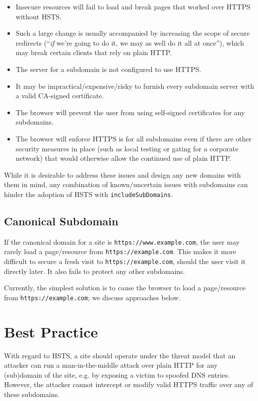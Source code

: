 \documentclass[conference]{./IEEEtran}
\newcommand{\site}[1]{\texttt{#1}}
\newcommand{\code}[1]{\texttt{#1}}
\newcommand{\iSD}{{\code{includeSubDomains}}}
\newcommand{\genericsite}{example.com}
\newcommand{\s}{{\site{https://\genericsite}}}
\newcommand{\sw}{{\site{https://www.\genericsite}}}
\theoremstyle{plain}
\begin{document}
\begin{itemize}
\item Insecure resources will fail to load and break pages that worked over HTTPS without HSTS.
\item Such a large change is usually accompanied by increasing the scope of secure redirects (``\emph{if} we're going to do it, we may as well do it all at once''), which may break certain clients that rely on plain HTTP.\item The server for a subdomain is not configured to use HTTPS.
\item It may be impractical/expensive/risky to furnish every subdomain server with a valid CA-signed certificate.
\item The browser will prevent the user from using self-signed certificates for any subdomains.
\item The browser will enforce HTTPS is for all subdomains even if there are other security measures in place (such as local testing or gating for a corporate network) that would otherwise allow the continued use of plain HTTP.
\end{itemize}

While it is desirable to address these issues and design any new domains with them in mind, any combination of known/uncertain issues with subdomains can hinder the adoption of HSTS with \iSD.

\subsection{Canonical Subdomain}

If the canonical domain for a site is \sw, the user may rarely load a page/resource from \s. This makes it more difficult to secure a fresh visit to \s, should the user visit it directly later. It also fails to protect any other subdomains.

Currently, the simplest solution is to cause the browser to load a page/resource from \s; we discuss approaches below. 

\section{Best Practice}

With regard to HSTS, a site should operate under the threat model that an attacker can run a man-in-the-middle attack over plain HTTP for any (sub)domain of the site, e.g. by exposing a victim to spoofed DNS entries. However, the attacker cannot intercept or modify valid HTTPS traffic over any of these subdomains.
\end{document}
